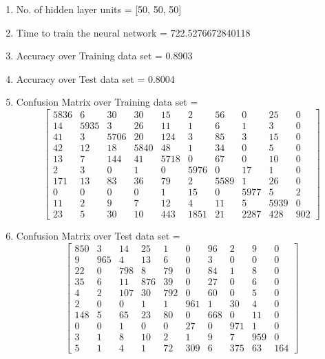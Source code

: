 \documentclass[11pt]{article}
\begin{document}
\hline
\begin{enumerate}
\item No. of hidden layer units = [50, 50, 50]
\item Time to train the neural network = 722.5276672840118
\item Accuracy over Training data set = 0.8903
\item Accuracy over Test data set = 0.8004
\item Confusion Matrix over Training data set = 
\begin{equation}
  \begin{bmatrix}
5836 & 6 & 30 & 30 & 15 & 2 & 56 & 0 & 25 & 0\\
14 & 5935 & 3 & 26 & 11 & 1 & 6 & 1 & 3 & 0\\
41 & 3 & 5706 & 20 & 124 & 3 & 85 & 3 & 15 & 0\\
42 & 12 & 18 & 5840 & 48 & 1 & 34 & 0 & 5 & 0\\
13 & 7 & 144 & 41 & 5718 & 0 & 67 & 0 & 10 & 0\\
2 & 3 & 0 & 1 & 0 & 5976 & 0 & 17 & 1 & 0\\
171 & 13 & 83 & 36 & 79 & 2 & 5589 & 1 & 26 & 0\\
0 & 0 & 0 & 0 & 1 & 15 & 0 & 5977 & 5 & 2\\
11 & 2 & 9 & 7 & 12 & 4 & 11 & 5 & 5939 & 0\\
23 & 5 & 30 & 10 & 443 & 1851 & 21 & 2287 & 428 & 902
  \end{bmatrix}
\end{equation}
\item Confusion Matrix over Test data set = 
\begin{equation}
  \begin{bmatrix}
850 & 3 & 14 & 25 & 1 & 0 & 96 & 2 & 9 & 0\\
9 & 965 & 4 & 13 & 6 & 0 & 3 & 0 & 0 & 0\\
22 & 0 & 798 & 8 & 79 & 0 & 84 & 1 & 8 & 0\\
35 & 6 & 11 & 876 & 39 & 0 & 27 & 0 & 6 & 0\\
4 & 2 & 107 & 30 & 792 & 0 & 60 & 0 & 5 & 0\\
2 & 0 & 0 & 1 & 1 & 961 & 1 & 30 & 4 & 0\\
148 & 5 & 65 & 23 & 80 & 0 & 668 & 0 & 11 & 0\\
0 & 0 & 1 & 0 & 0 & 27 & 0 & 971 & 1 & 0\\
3 & 1 & 8 & 10 & 2 & 1 & 9 & 7 & 959 & 0\\
5 & 1 & 4 & 1 & 72 & 309 & 6 & 375 & 63 & 164
  \end{bmatrix}
\end{equation}
\end{enumerate}
\end{document}
